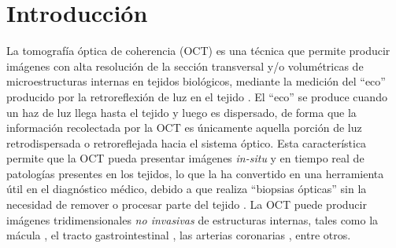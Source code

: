 \section{Introducción}


La tomografía óptica de coherencia (OCT) es una técnica que permite producir imágenes con alta resolución de la sección transversal y/o volumétricas de microestructuras internas en tejidos biológicos, mediante la medición del ``eco'' producido por la retroreflexión de luz en el tejido \cite{Huang1991}. El ``eco'' se produce cuando un haz de luz llega hasta el tejido y luego es dispersado, de forma que la información recolectada por la OCT es únicamente aquella porción de luz retrodispersada o retroreflejada hacia el sistema óptico. Esta característica permite que la OCT pueda presentar imágenes \emph{in-situ} y en tiempo real de patologías presentes en los tejidos, lo que la ha convertido en una herramienta útil en el diagnóstico médico, debido a que realiza ``biopsias ópticas'' sin la necesidad de remover o procesar parte del tejido \cite{Brezinski1996}. La OCT puede producir imágenes tridimensionales \emph{no invasivas} de estructuras internas, tales como la mácula \cite{Hee1995_4}, el tracto gastrointestinal \cite{Tearney1997}, las arterias coronarias \cite{Tearney1996_2}, entre otros.


